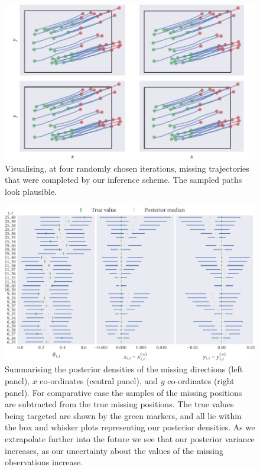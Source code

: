 \begin{figure}[tbp]
  \includegraphics{end/paths.pdf}
  \caption{Visualising, at four randomly chosen iterations, missing
  trajectories that were completed by our inference scheme. The sampled paths
  look plausible.}
  \label{fig:end_paths}
\end{figure}
\begin{figure}[tbp]
  \includegraphics{end/summary.pdf}
  \caption{Summarising the posterior densities of the missing directions (left
  panel), $x$ co-ordinates (central panel), and $y$ co-ordinates (right
  panel). For comparative ease the samples of the missing positions are
  subtracted from the true missing positions. The true values being
  targeted are shown by the green markers, and all lie within the box and
  whisker plots representing our posterior densities. As we extrapolate further
  into the future we see that our posterior variance increases, as our
  uncertainty about the values of the missing observations increase.}
  \label{fig:end_summary}
\end{figure}


